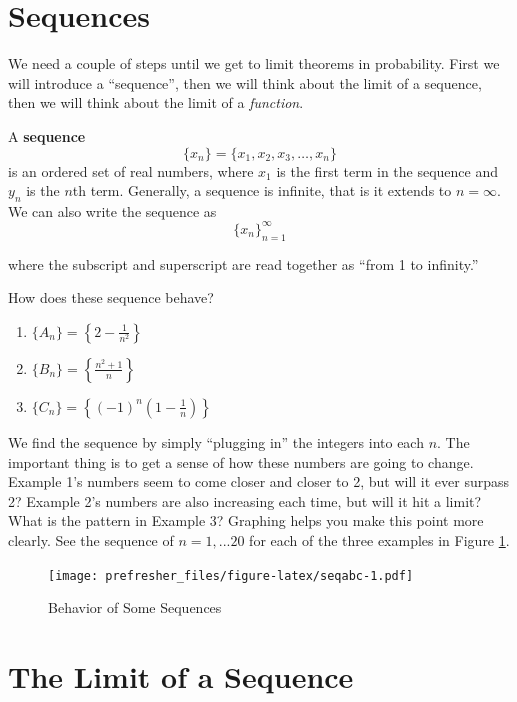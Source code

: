 \documentclass[]{book}
\providecommand{\tightlist}{%
  \setlength{\itemsep}{0pt}\setlength{\parskip}{0pt}}
\theoremstyle{definition}
\theoremstyle{definition}
\theoremstyle{definition}
\theoremstyle{remark}
\let\BeginKnitrBlock\begin \let\EndKnitrBlock\end
\begin{document}
\hypertarget{sequences}{%
\section{Sequences}\label{sequences}}

We need a couple of steps until we get to limit theorems in probability. First we will introduce a ``sequence'', then we will think about the limit of a sequence, then we will think about the limit of a \emph{function}.

A \textbf{sequence} \[\{x_n\}=\{x_1, x_2, x_3, \ldots, x_n\}\] is an ordered set of real numbers, where \(x_1\) is the first term in the sequence and \(y_n\) is the \(n\)th term. Generally, a sequence is infinite, that is it extends to \(n=\infty\). We can also write the sequence as \[\{x_n\}^\infty_{n=1}\]

where the subscript and superscript are read together as ``from 1 to infinity.''

\BeginKnitrBlock{example}[Sequences]
\protect\hypertarget{exm:seqbehav}{}{\label{exm:seqbehav} {} }
How does these sequence behave?

\begin{enumerate}
\def\labelenumi{\arabic{enumi}.}
\tightlist
\item
  \(\{A_n\}=\left\{ 2-\frac{1}{n^2} \right\}\)
\item
  \(\{B_n\}=\left\{\frac{n^2+1}{n} \right\}\)
\item
  \(\{C_n\}=\left\{(-1)^n \left(1-\frac{1}{n}\right) \right\}\)
\end{enumerate}
\EndKnitrBlock{example}

We find the sequence by simply ``plugging in'' the integers into each \(n\). The important thing is to get a sense of how these numbers are going to change. Example 1's numbers seem to come closer and closer to 2, but will it ever surpass 2? Example 2's numbers are also increasing each time, but will it hit a limit? What is the pattern in Example 3? Graphing helps you make this point more clearly. See the sequence of \(n = 1, ...20\) for each of the three examples in Figure \ref{fig:seqabc}.

\begin{figure}
\centering
\texttt{[image: prefresher\_files/figure-latex/seqabc-1.pdf]}
\caption{\label{fig:seqabc}Behavior of Some Sequences}
\end{figure}

\hypertarget{the-limit-of-a-sequence}{%
\section{The Limit of a Sequence}\label{the-limit-of-a-sequence}}
\end{document}
